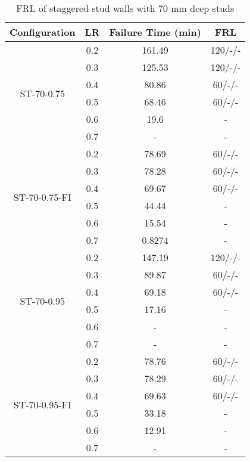 \begin{table}[!htbp]
	\centering
	\caption{FRL of staggered stud walls with 70 mm deep studs}
	  \begin{tabular}{cccc}
	  \toprule
	  Configuration & LR    & Failure Time (min) & FRL \\
	  \midrule
	  \multirow{6}[2]{*}{ST-70-0.75} & 0.2   & 161.49 & 120/-/- \\
			& 0.3   & 125.53 & 120/-/- \\
			& 0.4   & 80.86 & 60/-/- \\
			& 0.5   & 68.46 & 60/-/- \\
			& 0.6   & 19.6  & - \\
			& 0.7   & -     & - \\
	  \midrule
	  \multirow{6}[2]{*}{ST-70-0.75-FI} & 0.2   & 78.69 & 60/-/- \\
			& 0.3   & 78.28 & 60/-/- \\
			& 0.4   & 69.67 & 60/-/- \\
			& 0.5   & 44.44 & - \\
			& 0.6   & 15.54 & - \\
			& 0.7   & 0.8274 & - \\
	  \midrule
	  \multirow{6}[2]{*}{ST-70-0.95} & 0.2   & 147.19 & 120/-/- \\
			& 0.3   & 89.87 & 60/-/- \\
			& 0.4   & 69.18 & 60/-/- \\
			& 0.5   & 17.16 & - \\
			& 0.6   & -     & - \\
			& 0.7   & -     & - \\
	  \midrule
	  \multirow{6}[2]{*}{ST-70-0.95-FI} & 0.2   & 78.76 & 60/-/- \\
			& 0.3   & 78.29 & 60/-/- \\
			& 0.4   & 69.63 & 60/-/- \\
			& 0.5   & 33.18 & - \\
			& 0.6   & 12.91 & - \\
			& 0.7   & -     & - \\
	  \bottomrule
	  \end{tabular}%
	\label{tab:frl-parametric-st-70}%
\end{table}%

